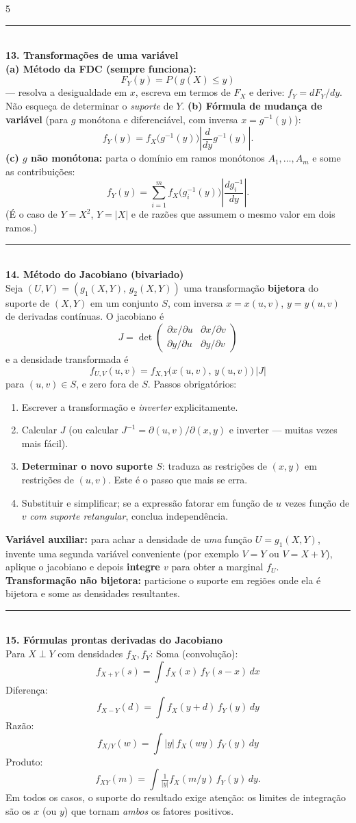 \documentclass[a4paper,8pt]{extarticle}
\newcommand{\tit}[1]{\vspace{2pt}\textcolor{azul}{\rule{\linewidth}{0.6pt}}\\[1pt]\textbf{\textcolor{azul}{#1}}\\[1pt]}
\begin{document}
\begin{multicols*}{5}
\tit{13. Transformações de uma variável}
\textbf{(a) Método da FDC (sempre funciona):}
\[F_Y(y)=P(g(X)\le y)\]
— resolva a desigualdade em $x$, escreva em termos de $F_X$ e derive: $f_Y=dF_Y/dy$. Não esqueça de determinar o \emph{suporte} de $Y$.
\textbf{(b) Fórmula de mudança de variável} (para $g$ monótona e diferenciável, com inversa $x=g^{-1}(y)$):
\[f_Y(y)=f_X\big(g^{-1}(y)\big)\left|\frac{d}{dy}g^{-1}(y)\right| .\]
\textbf{(c) $g$ não monótona:} parta o domínio em ramos monótonos $A_1,\dots,A_m$ e some as contribuições:
\[f_Y(y)=\sum_{i=1}^{m} f_X\big(g_i^{-1}(y)\big)\left|\frac{d g_i^{-1}}{dy}\right| .\]
(É o caso de $Y=X^2$, $Y=|X|$ e de razões que assumem o mesmo valor em dois ramos.)

\tit{14. Método do Jacobiano (bivariado)}
Seja $(U,V)=(g_1(X,Y),\,g_2(X,Y))$ uma transformação \textbf{bijetora} do suporte de $(X,Y)$ em um conjunto $S$, com inversa $x=x(u,v)$, $y=y(u,v)$ de derivadas contínuas. O jacobiano é
\[J=\det\begin{pmatrix}\partial x/\partial u & \partial x/\partial v\\[2pt] \partial y/\partial u & \partial y/\partial v\end{pmatrix}\]
e a densidade transformada é
\[f_{U,V}(u,v)=f_{X,Y}\big(x(u,v),\,y(u,v)\big)\,|J|\]
para $(u,v)\in S$, e zero fora de $S$. Passos obrigatórios:
\begin{enumerate}
\item Escrever a transformação e \emph{inverter} explicitamente.
\item Calcular $J$ (ou calcular $J^{-1}=\partial(u,v)/\partial(x,y)$ e inverter — muitas vezes mais fácil).
\item \textbf{Determinar o novo suporte $S$}: traduza as restrições de $(x,y)$ em restrições de $(u,v)$. Este é o passo que mais se erra.
\item Substituir e simplificar; se a expressão fatorar em função de $u$ vezes função de $v$ \emph{com suporte retangular}, conclua independência.
\end{enumerate}
\textbf{Variável auxiliar:} para achar a densidade de \emph{uma} função $U=g_1(X,Y)$, invente uma segunda variável conveniente (por exemplo $V=Y$ ou $V=X+Y$), aplique o jacobiano e depois \textbf{integre $v$} para obter a marginal $f_U$.
\textbf{Transformação não bijetora:} particione o suporte em regiões onde ela é bijetora e some as densidades resultantes.

\tit{15. Fórmulas prontas derivadas do Jacobiano}
Para $X\perp Y$ com densidades $f_X,f_Y$:
Soma (convolução):
\[f_{X+Y}(s)=\int f_X(x)\,f_Y(s-x)\,dx\]
Diferença:
\[f_{X-Y}(d)=\int f_X(y+d)\,f_Y(y)\,dy\]
Razão:
\[f_{X/Y}(w)=\int |y|\,f_X(wy)\,f_Y(y)\,dy\]
Produto:
\[f_{XY}(m)=\int \tfrac{1}{|y|}f_X(m/y)\,f_Y(y)\,dy .\]
Em todos os casos, o suporte do resultado exige atenção: os limites de integração são os $x$ (ou $y$) que tornam \emph{ambos} os fatores positivos.


\end{multicols*}
\end{document}
